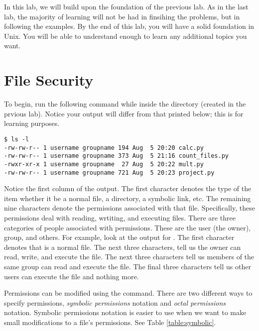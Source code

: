 \label{lab:Shell}


In this lab, we will build upon the foundation of the previous lab.
As in the last lab, the majority of learning will not be had in finsihing the problems, but in following the examples.
By the end of this lab, you will have a solid foundation in Unix.
You will be able to understand enough to learn any additional topics you want.

\section*{File Security}
To begin, run the following command while inside the  directory (created in the prvious lab).
Notice your output will differ from that printed below; this is for learning purposes.

\begin{lstlisting}
$ ls -l 
-rw-rw-r-- 1 username groupname 194 Aug  5 20:20 calc.py
-rw-rw-r-- 1 username groupname 373 Aug  5 21:16 count_files.py
-rwxr-xr-x 1 username groupname  27 Aug  5 20:22 mult.py
-rw-rw-r-- 1 username groupname 721 Aug  5 20:23 project.py

\end{lstlisting}

Notice the first column of the output.
The first character denotes the type of the item whether it be a normal file, a directory, a symbolic link, etc.
The remaining nine characters denote the permissions associated with that file. 
Specifically, these permissions deal with reading, wrtiting, and executing files.
There are three categories of people associated with permissions.
These are the user (the owner), group, and others.
For example, look at the output for .
The first character \li{-} denotes that  is a normal file. 
The next three characters,  tell us the owner can read, write, and execute the file.
The next three characters  tell us members of the same group can read and execute the file.
The final three characters  tell us other users can execute the file and nothing more.

Permissions can be modified using the  command.
There are two different ways to specify permissions, \emph{symbolic permissions} notation and \emph{octal permissions} notation.
Symbolic permissions notation is easier to use when we want to make small modifications to a file's permissions.
See Table \ref{table:symbolic}.

